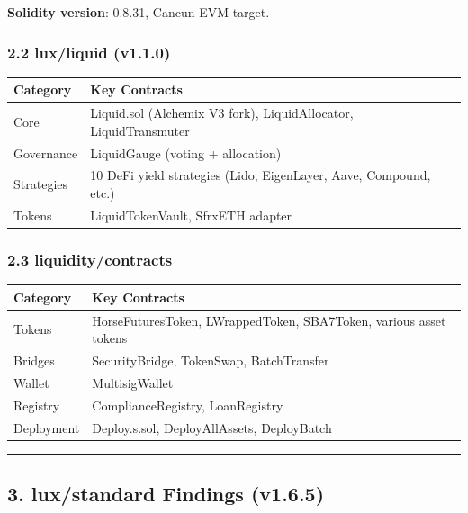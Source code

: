 \documentclass[
]{article}
\newcounter{none} %
\begin{document}
\textbf{Solidity version}: 0.8.31, Cancun EVM target.

\subsubsection{2.2 lux/liquid (v1.1.0)}\label{22-luxliquid-v110}

{\def\LTcaptype{none} %
\begin{longtable}[]{@{}ll@{}}
\toprule\noalign{}
Category & Key Contracts \\
\midrule\noalign{}
\endhead
\bottomrule\noalign{}
\endlastfoot
Core & Liquid.sol (Alchemix V3 fork), LiquidAllocator,
LiquidTransmuter \\
Governance & LiquidGauge (voting + allocation) \\
Strategies & 10 DeFi yield strategies (Lido, EigenLayer, Aave, Compound,
etc.) \\
Tokens & LiquidTokenVault, SfrxETH adapter \\
\end{longtable}
}

\subsubsection{2.3 liquidity/contracts}\label{23-liquiditycontracts}

{\def\LTcaptype{none} %
\begin{longtable}[]{@{}ll@{}}
\toprule\noalign{}
Category & Key Contracts \\
\midrule\noalign{}
\endhead
\bottomrule\noalign{}
\endlastfoot
Tokens & HorseFuturesToken, LWrappedToken, SBA7Token, various asset
tokens \\
Bridges & SecurityBridge, TokenSwap, BatchTransfer \\
Wallet & MultisigWallet \\
Registry & ComplianceRegistry, LoanRegistry \\
Deployment & Deploy.s.sol, DeployAllAssets, DeployBatch \\
\end{longtable}
}

\begin{center}\rule{0.5\linewidth}{0.5pt}\end{center}

\subsection{3. lux/standard Findings
(v1.6.5)}\label{3-luxstandard-findings-v165}
\end{document}
